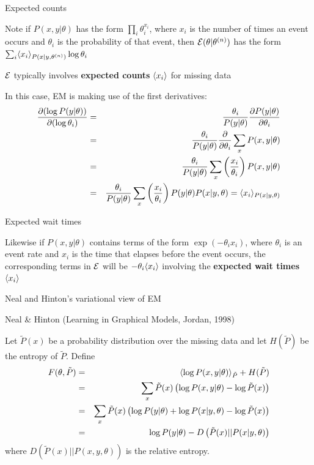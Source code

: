 \documentclass{beamer}
\begin{document}
\begin{frame}{Expected counts}

Note if $P(x,y|\theta)$ has the form $\prod_i \theta_i^{x_i}$,
where $x_i$ is the number of times an event occurs and $\theta_i$ is the probability of that event,
then ${\cal E}(\theta|\theta^{(n)})$ has the form $\sum_i \langle x_i \rangle_{P(x|y,\theta^{(n)})} \log \theta_i$

   \itemb
   \item ${\cal E}$ typically involves {\bf expected counts} $\langle x_i \rangle$ for missing data
\itemb
   \item In this case, EM is making use of the first derivatives:
\begin{eqnarray*}
\frac{\partial {(\log P(y|\theta))}}{\partial {(\log \theta_i)}} & = & \frac{\theta_i}{P(y|\theta)} \frac{\partial {P(y|\theta)}}{\partial {\theta_i}} \\
 & = & \frac{\theta_i}{P(y|\theta)} \frac{\partial}{\partial {\theta_i}} \sum_x P(x,y|\theta) \\
 & = & \frac{\theta_i}{P(y|\theta)} \sum_x \left( \frac{x_i}{\theta_i} \right) P(x,y|\theta) \\
 & = & \frac{\theta_i}{P(y|\theta)} \sum_x \left( \frac{x_i}{\theta_i} \right) P(y|\theta) P(x|y,\theta)
= \langle x_i \rangle_{P(x|y,\theta)}
\end{eqnarray*}
   \iteme
\iteme

\end{frame}

\begin{frame}{Expected wait times}

\itemb
  \item Likewise if $P(x,y|\theta)$ contains terms of the form $\exp(-\theta_i x_i)$, where $\theta_i$ is an event rate and $x_i$ is the time that elapses before the event occurs,
the corresponding terms in ${\cal E}$ will be $-\theta_i \langle x_i \rangle$ involving the {\bf expected wait times} $\langle x_i \rangle$
  \iteme

\end{frame}

\begin{frame}{Neal and Hinton's variational view of EM}

\itemb
 \item Neal \& Hinton (Learning in Graphical Models, Jordan, 1998)
  \itemb
  \item Let $\tilde{P}(x)$ be a probability distribution over the missing data and let $H(\tilde{P})$ be the entropy of $\tilde{P}$. Define
\begin{eqnarray*}
F(\theta,\tilde{P}) & = & \langle \log P(x,y|\theta) \rangle_{\tilde{P}} + H(\tilde{P}) \\
& = & \sum_x \tilde{P}(x) \left( \log P(x,y|\theta) - \log \tilde{P}(x) \right) \\
& = & \sum_x \tilde{P}(x) \left( \log P(y|\theta) + \log P(x|y,\theta) - \log \tilde{P}(x) \right) \\
& = & \log P(y|\theta) - D \left( \tilde{P}(x)||P(x|y,\theta) \right)
\end{eqnarray*}
where $D(\tilde{P}(x)||P(x,y,\theta))$ is the relative entropy.
  \iteme
 \iteme

\end{frame}
\end{document}
